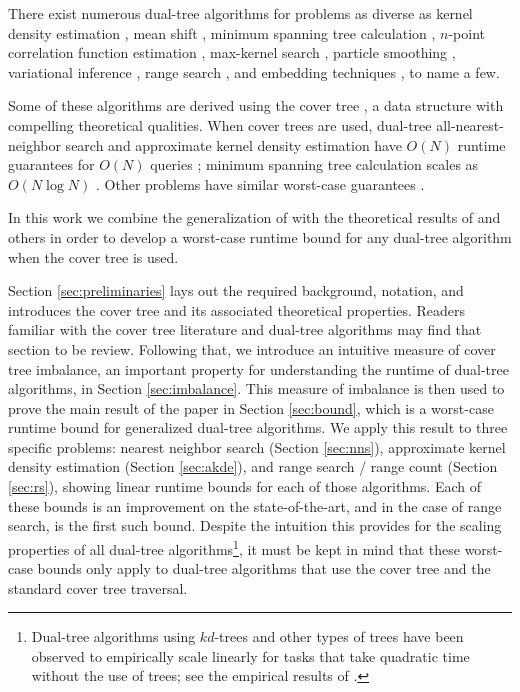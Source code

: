 \documentclass[twoside,11pt]{article} %
\begin{document}
There exist numerous dual-tree algorithms for problems as diverse as kernel
density estimation \citep{gray2003nonparametric}, mean shift \citep{wang2007fast},
minimum spanning tree calculation \citep{march2010euclidean}, $n$-point
correlation function estimation \citep{march2012fast}, max-kernel search
\citep{curtin2013fast}, particle smoothing \citep{klaas2006fast}, variational
inference \citep{amizadeh2012variational}, range search \citep{nbody}, and
embedding techniques \cite{maaten2014accelerating}, to name a few.

Some of these algorithms are derived using the cover tree \citep{langford2006}, a
data structure with compelling theoretical qualities.  When cover trees are
used, dual-tree all-nearest-neighbor search and approximate kernel density
estimation have $O(N)$ runtime guarantees for $O(N)$ queries \citep{ram2009};
minimum spanning tree calculation scales as $O(N \log N)$
\citep{march2010euclidean}.  Other problems have similar worst-case guarantees
\citep{curtin2014dual, march2013multi}.

In this work we combine the generalization of \citet{curtin2013tree} with the
theoretical results of \citet{langford2006} and others in order to develop a
worst-case runtime bound for any dual-tree algorithm when the cover tree is
used.

Section \ref{sec:preliminaries} lays out the required background, notation, and
introduces the cover tree and its associated theoretical properties.  Readers
familiar with the cover tree literature and dual-tree algorithms
\citep[especially][]{curtin2013tree} may find that section to be review.
Following that, we introduce an intuitive measure of cover tree imbalance, an
important property for understanding the runtime of dual-tree algorithms, in
Section \ref{sec:imbalance}.  This measure of imbalance is then used to prove
the main result of the paper in Section \ref{sec:bound}, which is a worst-case
runtime bound for generalized dual-tree algorithms.  We apply this result to
three specific problems: nearest neighbor search (Section \ref{sec:nns}),
approximate kernel density estimation (Section \ref{sec:akde}), and range search
/ range count (Section \ref{sec:rs}), showing linear runtime bounds for each of
those algorithms.  Each of these bounds is an improvement on the
state-of-the-art, and in the case of range search, is the first such bound.
Despite the intuition this provides for the scaling properties of all dual-tree
algorithms\footnote{Dual-tree algorithms using $kd$-trees and other types of
trees have been observed to empirically scale linearly for tasks that take
quadratic time without the use of trees; see the empirical results of
\citet{nbody, march2010euclidean, vladymyrov2014linear, klaas2006fast,
gray2003nonparametric}.}, it must be kept in mind that these worst-case bounds
only apply to dual-tree algorithms that use the cover tree and the standard
cover tree traversal.
\end{document}
